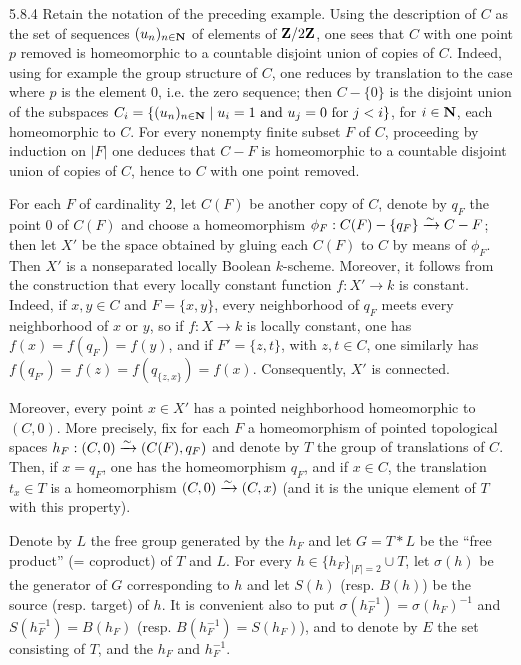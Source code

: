 \begin{example}{5.8.4}\label{VIB.5.8.4}
Retain the notation of the preceding example. Using the description of $C$ as the set of sequences $(u_n)_{n\in\mathbf{N}}$ of elements of $\mathbf{Z}/2\mathbf{Z}$, one sees that $C$ with one point $p$ removed is homeomorphic to a countable disjoint union of copies of $C$. Indeed, using for example the group structure of $C$, one reduces by translation to the case where $p$ is the element $0$, i.e. the zero sequence; then $C-\{0\}$ is the disjoint union of the subspaces $C_i=\{(u_n)_{n\in\mathbf{N}}\mid u_i=1\text{ and }u_j=0\text{ for }j<i\}$, for $i\in\mathbf{N}$, each homeomorphic to $C$. For every nonempty finite subset $F$ of $C$, proceeding by induction on $|F|$ one deduces that $C-F$ is homeomorphic to a countable disjoint union of copies of $C$, hence to $C$ with one point removed.

For each $F$ of cardinality $2$, let $C(F)$ be another copy of $C$, denote by $q_F$ the point $0$ of $C(F)$ and choose a homeomorphism $\phi_F:C(F)-\{q_F\}\xrightarrow{\sim} C-F$; then let $X'$ be the space obtained by gluing each $C(F)$ to $C$ by means of $\phi_F$. Then $X'$ is a nonseparated locally Boolean $k$-scheme. Moreover, it follows from the construction that every locally constant function $f:X'\to k$ is constant. Indeed, if $x,y\in C$ and $F=\{x,y\}$, every neighborhood of $q_F$ meets every neighborhood of $x$ or $y$, so if $f:X\to k$ is locally constant, one has $f(x)=f(q_F)=f(y)$, and if $F'=\{z,t\}$, with $z,t\in C$, one similarly has $f(q_{F'})=f(z)=f(q_{\{z,x\}})=f(x)$. Consequently, $X'$ is connected.

Moreover, every point $x\in X'$ has a pointed neighborhood homeomorphic to $(C,0)$. More precisely, fix for each $F$ a homeomorphism of pointed topological spaces $h_F:(C,0)\xrightarrow{\sim}(C(F),q_F)$ and denote by $T$ the group of translations of $C$. Then, if $x=q_F$, one has the homeomorphism $q_F$, and if $x\in C$, the translation $t_x\in T$ is a homeomorphism $(C,0)\xrightarrow{\sim}(C,x)$ (and it is the unique element of $T$ with this property).

Denote by $L$ the free group generated by the $h_F$ and let $G=T*L$ be the ``free product'' (= coproduct) of $T$ and $L$. For every $h\in\{h_F\}_{|F|=2}\cup T$, let $\sigma(h)$ be the generator of $G$ corresponding to $h$ and let $S(h)$ (resp. $B(h)$) be the source (resp. target) of $h$. It is convenient also to put $\sigma(h_F^{-1})=\sigma(h_F)^{-1}$ and $S(h_F^{-1})=B(h_F)$ (resp. $B(h_F^{-1})=S(h_F)$), and to denote by $E$ the set consisting of $T$, and the $h_F$ and $h_F^{-1}$.


\end{example}
